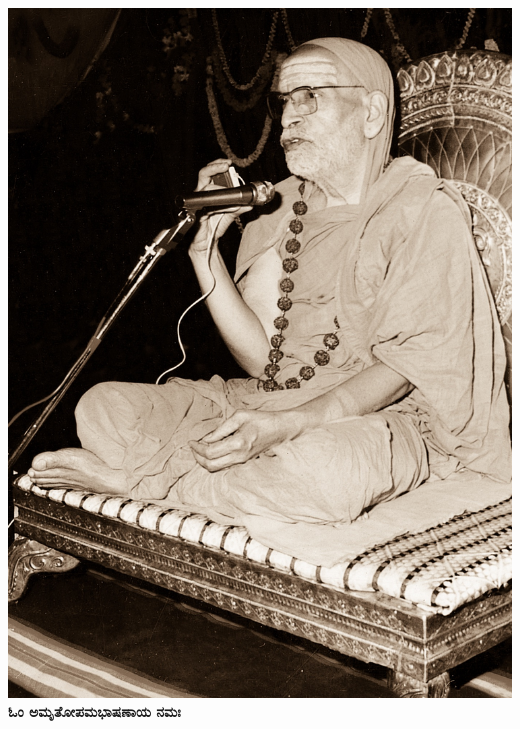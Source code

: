~\vfill

\begin{center}
\includegraphics{src/images/100_PICT_6.jpg}\\
{\bf ಓಂ ಅಮೃತೋಪಮಭಾಷಣಾಯ ನಮಃ}
\end{center}

~\vfill
